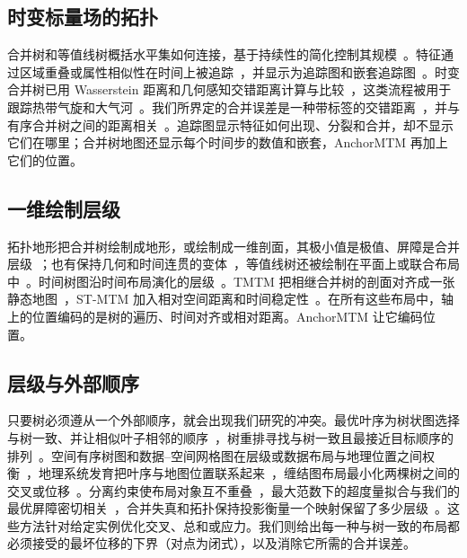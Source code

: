 \documentclass[preprint]{vgtc_zh}   %
\begin{document}
\subsection{时变标量场的拓扑}
合并树和等值线树概括水平集如何连接，基于持续性的简化控制其规模~\cite{Heine:2016:Survey,Edelsbrunner:2002:TPS,Tierny:2018:TTK}。特征通过区域重叠或属性相似性在时间上被追踪~\cite{Silver:1997:Tracking,Saikia:2017:GFT}，并显示为追踪图和嵌套追踪图~\cite{Widanagamaachchi:2012:DTG,Lukasczyk:2017:NTG,Lukasczyk:2020:DNTG}。时变合并树已用 Wasserstein 距离和几何感知交错距离计算与比较~\cite{Oesterling:2017:TVMT,Pont:2022:WMT,Yan:2022:GAMT,Yan:2021:Survey}，这类流程被用于跟踪热带气旋和大气河~\cite{Yan:2024:TROPHY,Lan:2024:AR}。我们所界定的合并误差是一种带标签的交错距离~\cite{Munch:2019:LINF,Gasparovic:2024:IID,Morozov:2013:IDMT}，并与有序合并树之间的距离相关~\cite{Beurskens:2025:OMT}。追踪图显示特征如何出现、分裂和合并，却不显示它们在哪里；合并树地图还显示每个时间步的数值和嵌套，AnchorMTM 再加上它们的位置。

\subsection{一维绘制层级}
拓扑地形把合并树绘制成地形，或绘制成一维剖面，其极小值是极值、屏障是合并层级~\cite{Weber:2007:TL,Oesterling:2013:TLP}；也有保持几何和时间连贯的变体~\cite{Beketayev:2012:GPTL,Herick:2020:TCTL}，等值线树还被绘制在平面上或联合布局中~\cite{Heine:2011:DCT,Lohfink:2020:FCT}。时间树图沿时间布局演化的层级~\cite{Koepp:2019:TT}。TMTM 把相继合并树的剖面对齐成一张静态地图~\cite{Koepp:2023:TMTM}，ST-MTM 加入相对空间距离和时间稳定性~\cite{STMTM:2026}。在所有这些布局中，轴上的位置编码的是树的遍历、时间对齐或相对距离。AnchorMTM 让它编码位置。

\subsection{层级与外部顺序}
只要树必须遵从一个外部顺序，就会出现我们研究的冲突。最优叶序为树状图选择与树一致、并让相似叶子相邻的顺序~\cite{BarJoseph:2001:OLO,Eisen:1998:CA}，树重排寻找与树一致且最接近目标顺序的排列~\cite{Bulteau:2022:RT}。空间有序树图和数据--空间网格图在层级或数据布局与地理位置之间权衡~\cite{Wood:2008:SOT,vanBeusekom:2023:DSL}，地理系统发育把叶序与地图位置联系起来~\cite{Klawitter:2025:GP}，缠结图布局最小化两棵树之间的交叉或位移~\cite{Fernau:2010:CTC,Huson:2026:DOT}。分离约束使布局对象互不重叠~\cite{Dwyer:2006:IPSEP,Li:2019:SOI}，最大范数下的超度量拟合与我们的最优屏障密切相关~\cite{Farach:1995:RM}，合并失真和拓扑保持投影衡量一个映射保留了多少层级~\cite{Eldridge:2015:MD,Doraiswamy:2021:TM}。这些方法针对给定实例优化交叉、总和或应力。我们则给出每一种与树一致的布局都必须接受的最坏位移的下界（对点为闭式），以及消除它所需的合并误差。
\end{document}
